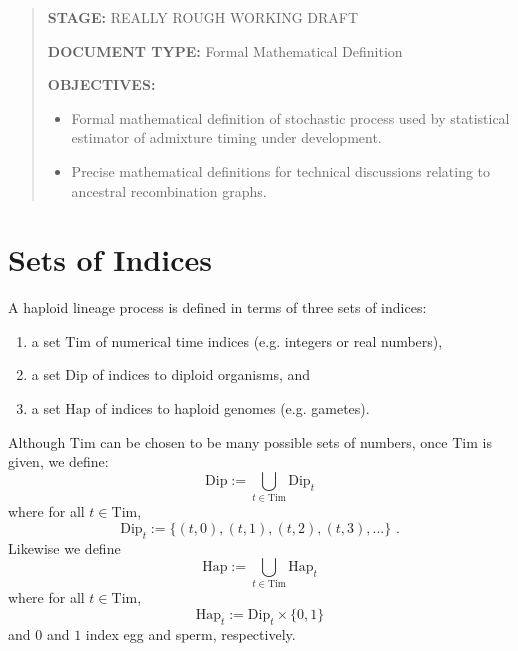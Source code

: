 \documentclass{article}
\begin{document}
\newcommand{\mathstop}{\text{ .}}
\renewcommand{\Pr}{\operatorname{\mathbb{P}}}
\newcommand{\dom}{\operatorname{dom}}
\newcommand{\rng}{\operatorname{rng}}
\newcommand{\Tim}{\mathrm{Tim}}
\newcommand{\Hap}{\mathrm{Hap}}
\newcommand{\Dip}{\mathrm{Dip}}
\newcommand{\Liv}{\mathrm{Liv}}
\newcommand{\Par}{\mathrm{Par}}
\newcommand{\Mom}{\mathrm{Mom}}
\newcommand{\Fert}{\mathrm{Fert}}
\newcommand{\Loc}{\mathrm{Loc}}
\newcommand{\Lin}{\mathsf{Lin}}
\newcommand{\Leg}{\mathsf{Leg}}
\newcommand{\Nodes}{\mathsf{Nodes}}


\begin{abstract}
\textbf{STAGE:} REALLY ROUGH WORKING DRAFT

\textbf{DOCUMENT TYPE:} Formal Mathematical Definition

\textbf{OBJECTIVES:}

\begin{itemize}
\item
  Formal mathematical definition of stochastic process used by
  statistical estimator of admixture timing under development.
\item
  Precise mathematical definitions for technical discussions relating to
  ancestral recombination graphs.
\end{itemize}
\end{abstract}


\section{Sets of Indices}

A haploid lineage process is defined in terms of three sets of indices:
\begin{enumerate}
\item
  a set $\Tim$ of numerical time indices (e.g. integers or real numbers),
\item
  a set $\Dip$ of indices to diploid organisms, and
\item
  a set $\Hap$ of indices to haploid genomes (e.g. gametes).
\end{enumerate}

Although $\Tim$ can be chosen to be many possible sets of numbers, once $\Tim$
is given, we define:
$$
\Dip := \bigcup_{t \in \Tim} \Dip_t
$$
where for all $t \in \Tim$,
$$
\Dip_t := \{ (t, 0), (t, 1), (t, 2), (t, 3), ... \}
\mathstop
$$
Likewise we define
$$
\Hap := \bigcup_{t \in \Tim} \Hap_t
$$
where for all $t \in \Tim$,
$$
\Hap_t := \Dip_t \times \{ 0, 1 \}
$$
and $0$ and $1$ index egg and sperm, respectively.
\end{document}
